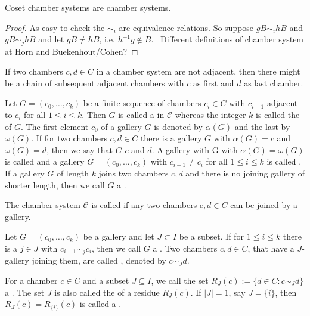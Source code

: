 \begin{lemm}
	Coset chamber systems are chamber systems.

	\begin{proof}
		As easy to check the $\sim_i$ are equivalence relations. So suppose $gB \sim_i hB$ and $gB \sim_j hB$ and let $gB \neq hB$, i.e. $h^{-1}g \notin B$. \todo \ Different definitions of chamber system at Horn and Buekenhout/Cohen?
	\end{proof}
\end{lemm}

If two chambers $c,d \in C$ in a chamber system are not adjacent, then there might be a chain of subsequent adjacent chambers with $c$ as first and $d$ as last chamber.

\begin{defi}
	Let $G = (c_0,\ldots,c_k)$ be a finite sequence of chambers $c_i \in C$ with $c_{i-1}$ adjacent to $c_i$ for all $1 \leq i \leq k$. Then $G$ is called a  in $\mathcal{C}$ whereas the integer $k$ is called the  of $G$. The first element $c_0$ of a gallery $G$ is denoted by $\alpha(G)$ and the last by $\omega(G)$. If for two chambers $c,d \in C$ there is a gallery $G$ with $\alpha(G) = c$ and $\omega(G) = d$, then we say that $G$  $c$ and $d$. A gallery with G with $\alpha(G) = \omega(G)$ is called  and a gallery $G = (c_0,\ldots,c_k)$ with $c_{i-1} \neq c_i$ for all $1 \leq i \leq k$ is called . If a gallery $G$ of length $k$ joins two chambers $c,d$ and there is no joining gallery of shorter length, then we call $G$ a .
\end{defi}

\begin{defi}
	The chamber system $\mathcal{C}$ is called  if any two chambers $c,d \in C$ can be joined by a gallery.
\end{defi}

\begin{defi}
	Let $G = (c_0,\ldots,c_k)$ be a gallery and let $J \subset I$ be a subset. If for $1 \leq i \leq k$ there is a $j \in J$ with $c_{i-1} \sim_j c_i$, then we call $G$ a . Two chambers $c,d \in C$, that have a $J$-gallery joining them, are called , denoted by $c \sim_J d$.
\end{defi}

\begin{defi}
	For a chamber $c \in C$ and a subset $J \subseteq I$, we call the set $R_J(c) := \{ d \in C : c \sim_J d \}$ a . The set $J$ is also called the  of a residue $R_J(c)$. If $|J| = 1$, say $J = \{i\}$, then $R_J(c) = R_{\{i\}}(c)$ is called a .
\end{defi}

